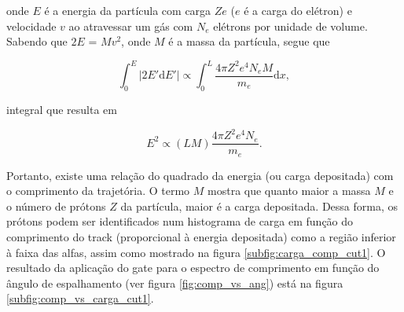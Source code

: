 \documentclass[a4paper,12pt,oneside]{book}
\begin{document}

\par onde $E$ é a energia da partícula com carga $Ze$ ($e$ é a carga do elétron) e velocidade $v$ ao atravessar um gás com $N_e$ elétrons por unidade de volume. Sabendo que $2E$ = $Mv^2$, onde $M$ é a massa da partícula, segue que

\begin{equation}\label{eq:bethe_block_low_energies_2}
	\int^{E}_0 \left | 2E'\mathrm{d}E' \right | \propto \int^{L}_0 \frac{4\pi Z^2  e^4 N_e M}{m_e} \mathrm{d}x,
\end{equation}

\par integral que resulta em

\begin{equation}\label{eq:bethe_block_low_energies_3}
	E^2 \propto (LM)\frac{4\pi Z^2  e^4 N_e}{m_e}.
\end{equation}

\par Portanto, existe uma relação do quadrado da energia (ou carga depositada) com o comprimento da trajetória. O termo $M$ mostra que quanto maior a massa $M$ e o número de prótons $Z$ da partícula, maior é a carga depositada. Dessa forma, os prótons podem ser identificados num histograma de carga em função do comprimento do track (proporcional à energia depositada) como a região inferior à faixa das alfas, assim como mostrado na figura \ref{subfig:carga_comp_cut1}. O resultado da aplicação do gate para o espectro de comprimento em função do ângulo de espalhamento (ver figura \ref{fig:comp_vs_ang}) está na figura \ref{subfig:comp_vs_carga_cut1}.
\end{document}
